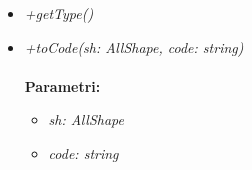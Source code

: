 \begin{itemize}
\begin{itemize}
\begin{itemize}
    		\end{itemize}
    		\item \emph{+getType()}\\
    		
    		\item \emph{+toCode(sh: AllShape, code: string)}\\
    		\\
    		\textbf{Parametri:}
    		\begin{itemize}
    			\item \emph{sh: AllShape}\\
    			
    			\item \emph{code: string}\\
    			
    		\end{itemize}
    	\end{itemize}
\end{itemize}